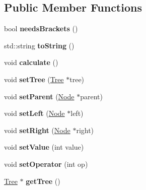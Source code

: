\subsection*{Public Member Functions}
\begin{DoxyCompactItemize}
\item 
bool {\bfseries needs\+Brackets} ()\hypertarget{classNode_a261c181a5903859426230097c9733441}{}\label{classNode_a261c181a5903859426230097c9733441}

\item 
std\+::string {\bfseries to\+String} ()\hypertarget{classNode_ab68ba2e4b8b4b4aa5cd9cdcfe03277f3}{}\label{classNode_ab68ba2e4b8b4b4aa5cd9cdcfe03277f3}

\item 
void {\bfseries calculate} ()\hypertarget{classNode_afef1e95a8f3a2056feec47a44ce0007c}{}\label{classNode_afef1e95a8f3a2056feec47a44ce0007c}

\item 
void {\bfseries set\+Tree} (\hyperlink{classTree}{Tree} $\ast$tree)\hypertarget{classNode_aafb43f6bd3ce1e8d0a6e339ce33afec7}{}\label{classNode_aafb43f6bd3ce1e8d0a6e339ce33afec7}

\item 
void {\bfseries set\+Parent} (\hyperlink{classNode}{Node} $\ast$parent)\hypertarget{classNode_ab5f0786bcb59591c528efb0b776797fc}{}\label{classNode_ab5f0786bcb59591c528efb0b776797fc}

\item 
void {\bfseries set\+Left} (\hyperlink{classNode}{Node} $\ast$left)\hypertarget{classNode_a9022102d755b999dc0f6ed97142b80f2}{}\label{classNode_a9022102d755b999dc0f6ed97142b80f2}

\item 
void {\bfseries set\+Right} (\hyperlink{classNode}{Node} $\ast$right)\hypertarget{classNode_ab93f8f7d56241bc2b978595b208604dc}{}\label{classNode_ab93f8f7d56241bc2b978595b208604dc}

\item 
void {\bfseries set\+Value} (int value)\hypertarget{classNode_a9e337c1790152faf945a87207d7e1125}{}\label{classNode_a9e337c1790152faf945a87207d7e1125}

\item 
void {\bfseries set\+Operator} (int op)\hypertarget{classNode_a9e474c9df32b49bd241b0057c35cd91d}{}\label{classNode_a9e474c9df32b49bd241b0057c35cd91d}

\item 
\hyperlink{classTree}{Tree} $\ast$ {\bfseries get\+Tree} ()\hypertarget{classNode_ab1ca8e497b3c925507a36b4988cd6161}{}\label{classNode_ab1ca8e497b3c925507a36b4988cd6161}


\end{DoxyCompactItemize}
